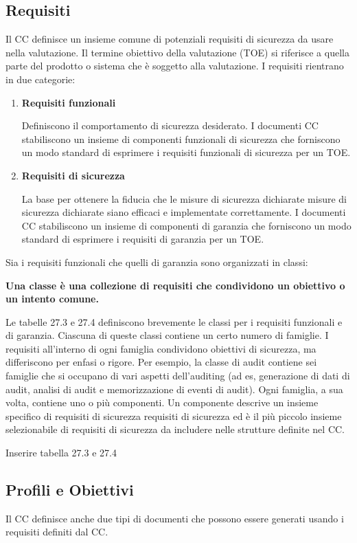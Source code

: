 \subsection{Requisiti}
Il CC definisce un insieme comune di potenziali requisiti di sicurezza da usare nella valutazione. Il termine obiettivo della valutazione (TOE) si riferisce a quella parte del prodotto o sistema che è soggetto alla valutazione. I requisiti rientrano in due categorie:
\begin{enumerate}
    \item \textbf{Requisiti funzionali}
    
    Definiscono il comportamento di sicurezza desiderato. I documenti CC stabiliscono un insieme di componenti funzionali di sicurezza che forniscono un modo standard di esprimere i requisiti funzionali di sicurezza per un TOE.
    
    \item \textbf{Requisiti di sicurezza}
    
    La base per ottenere la fiducia che le misure di sicurezza dichiarate misure di sicurezza dichiarate siano efficaci e implementate correttamente. I documenti CC stabiliscono un insieme di componenti di garanzia che forniscono un modo standard di esprimere i requisiti di garanzia per un TOE.
\end{enumerate}
Sia i requisiti funzionali che quelli di garanzia sono organizzati in classi:
\begin{center}
    \textbf{Una classe è una collezione di requisiti che condividono un obiettivo o un intento comune.}
\end{center}
Le tabelle 27.3 e 27.4 definiscono brevemente le classi per i requisiti funzionali e di garanzia. Ciascuna di queste classi contiene un certo numero di famiglie. I requisiti all'interno di ogni famiglia condividono obiettivi di sicurezza, ma differiscono per enfasi o rigore. Per esempio, la classe di audit contiene sei famiglie che si occupano di vari aspetti dell'auditing (ad es, generazione di dati di audit, analisi di audit e memorizzazione di eventi di audit). Ogni famiglia, a sua volta, contiene uno o più componenti. Un componente descrive un insieme specifico di requisiti di sicurezza requisiti di sicurezza ed è il più piccolo insieme selezionabile di requisiti di sicurezza da includere nelle strutture definite nel CC.

Inserire tabella 27.3 e 27.4
\newpage
\subsection{Profili e Obiettivi}
Il CC definisce anche due tipi di documenti che possono essere generati usando i requisiti definiti dal CC.

